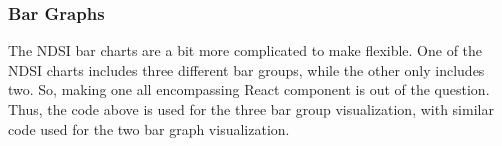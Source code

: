 \subsubsection{Bar Graphs}


\noindent The NDSI bar charts are a bit more complicated to make flexible. One of the NDSI charts includes three different bar groups, while the other only includes two. So, making one all encompassing React component is out of the question. Thus, the code above is used for the three bar group visualization, with similar code used for the two bar graph visualization.
